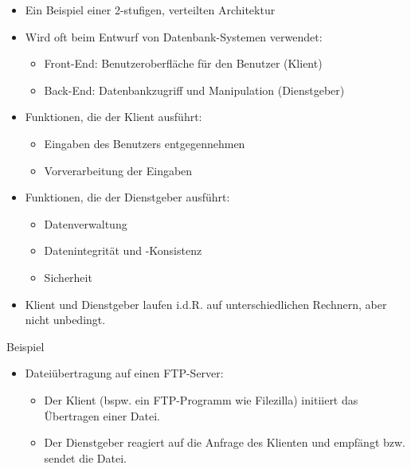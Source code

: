 \begin{itemize}
    \item Ein Beispiel einer 2-stufigen, verteilten Architektur
    \item Wird oft beim Entwurf von Datenbank-Systemen verwendet:
    \begin{itemize}
        \item Front-End: Benutzeroberfläche für den Benutzer (Klient)
        \item Back-End: Datenbankzugriff und Manipulation (Dienstgeber)
    \end{itemize}
    \item Funktionen, die der Klient ausführt:
    \begin{itemize}
        \item Eingaben des Benutzers entgegennehmen
        \item Vorverarbeitung der Eingaben
    \end{itemize}
    \item Funktionen, die der Dienstgeber ausführt:
    \begin{itemize}
        \item Datenverwaltung
        \item Datenintegrität und -Konsistenz
        \item Sicherheit
    \end{itemize}
    \item Klient und Dienstgeber laufen i.d.R. auf unterschiedlichen Rechnern, aber nicht unbedingt.
\end{itemize}

Beispiel

\begin{itemize}
    \item Dateiübertragung auf einen FTP-Server:
    \begin{itemize}
        \item Der Klient (bspw. ein FTP-Programm wie Filezilla) initiiert das Übertragen einer Datei.
        \item Der Dienstgeber reagiert auf die Anfrage des Klienten und empfängt bzw. sendet die Datei.
    \end{itemize}
\end{itemize}

